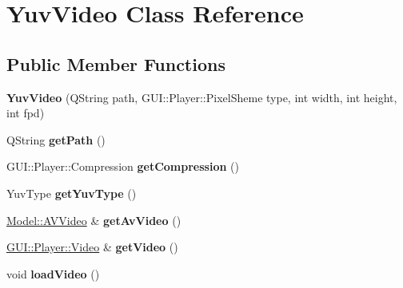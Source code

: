 \hypertarget{classModel_1_1YuvVideo}{}\section{Yuv\+Video Class Reference}
\label{classModel_1_1YuvVideo}
\subsection*{Public Member Functions}
\begin{DoxyCompactItemize}
\item 
\hypertarget{classModel_1_1YuvVideo_aa4a59162d00e62613baf21f53696d459}{}{\bfseries Yuv\+Video} (Q\+String path, G\+U\+I\+::\+Player\+::\+Pixel\+Sheme type, int width, int height, int fpd)\label{classModel_1_1YuvVideo_aa4a59162d00e62613baf21f53696d459}

\item 
\hypertarget{classModel_1_1YuvVideo_a1a94d0c9bf9dd725556721ac914025e3}{}Q\+String {\bfseries get\+Path} ()\label{classModel_1_1YuvVideo_a1a94d0c9bf9dd725556721ac914025e3}

\item 
\hypertarget{classModel_1_1YuvVideo_a139617717a18c742c6a9e3183f815903}{}G\+U\+I\+::\+Player\+::\+Compression {\bfseries get\+Compression} ()\label{classModel_1_1YuvVideo_a139617717a18c742c6a9e3183f815903}

\item 
\hypertarget{classModel_1_1YuvVideo_aded650e8b9796ea86dc24a9b75b3a8ec}{}Yuv\+Type {\bfseries get\+Yuv\+Type} ()\label{classModel_1_1YuvVideo_aded650e8b9796ea86dc24a9b75b3a8ec}

\item 
\hypertarget{classModel_1_1YuvVideo_a58bd43e5cbaa711bf19b0c71efbc9834}{}\hyperlink{classModel_1_1AVVideo}{Model\+::\+A\+V\+Video} \& {\bfseries get\+Av\+Video} ()\label{classModel_1_1YuvVideo_a58bd43e5cbaa711bf19b0c71efbc9834}

\item 
\hypertarget{classModel_1_1YuvVideo_a56ebcfcff7dfad1f4b9e302794451afe}{}\hyperlink{classGUI_1_1Player_1_1Video}{G\+U\+I\+::\+Player\+::\+Video} \& {\bfseries get\+Video} ()\label{classModel_1_1YuvVideo_a56ebcfcff7dfad1f4b9e302794451afe}

\item 
\hypertarget{classModel_1_1YuvVideo_a220f0cb424996d91cbe098b02c484bb0}{}void {\bfseries load\+Video} ()\label{classModel_1_1YuvVideo_a220f0cb424996d91cbe098b02c484bb0}

\end{DoxyCompactItemize}
